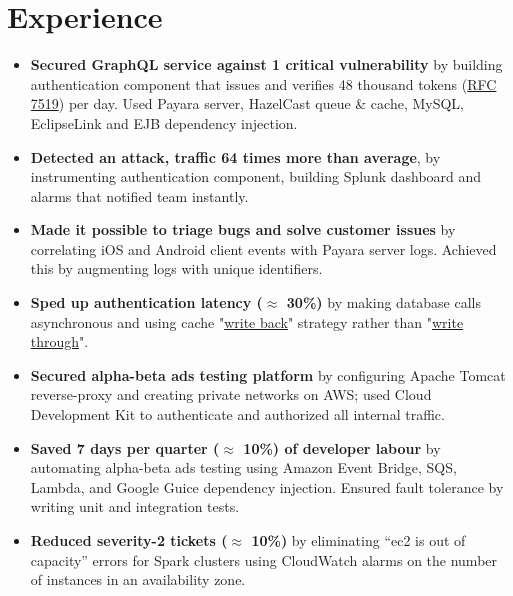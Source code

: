 \section{Experience}
\begin{itemize}[leftmargin=*]
    \item {
        \textbf{Secured GraphQL service against 1 critical vulnerability} by building authentication component that issues and verifies 48 thousand tokens (\href{https://datatracker.ietf.org/doc/html/rfc7519}{RFC 7519}) per day. Used Payara server, HazelCast queue \& cache, MySQL, EclipseLink and EJB dependency injection.
    }
    \item {
        \textbf{Detected an attack, traffic 64 times more than average}, by instrumenting authentication component, building Splunk dashboard and alarms that notified team instantly.
    }
    \item {
        \textbf{Made it possible to triage bugs and solve customer issues} by correlating iOS and Android client events with Payara server logs. Achieved this by augmenting logs with unique identifiers.
    }
    \item {
        \textbf{Sped up authentication latency ($\approx$ 30\%)} by making database calls asynchronous and using cache "\href{https://en.wikipedia.org/wiki/Cache_(computing)#Writing_policies}{write back}" strategy rather than "\href{https://en.wikipedia.org/wiki/Cache_(computing)#Writing_policies}{write through}".
    }
\end{itemize}

\begin{itemize}[leftmargin=*]
    \item {
        \textbf{Secured alpha-beta ads testing platform} by configuring Apache Tomcat reverse-proxy and creating private networks on AWS; used Cloud Development Kit to authenticate and authorized all internal traffic.
    }
    \item {
        \textbf{Saved 7 days per quarter ($\approx$ 10\%) of developer labour} by automating alpha-beta ads testing using Amazon Event Bridge, SQS, Lambda, and Google Guice dependency injection. Ensured fault tolerance by writing unit and integration tests.
    }
    \item {
        \textbf{Reduced severity-2 tickets ($\approx$ 10\%)} by eliminating “ec2 is out of capacity” errors for Spark clusters using CloudWatch alarms on the number of instances in an availability zone.
    }
\end{itemize}

